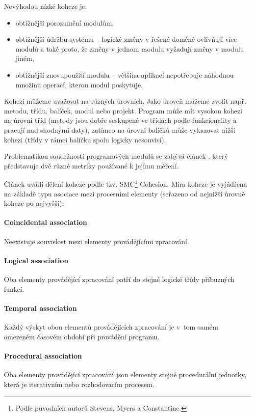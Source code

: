 Nevýhodou nízké koheze je:
\begin{itemize}
\item obtížnější porozumění modulům,
\item obtížnější údržbu systému -- logické změny v řešené doméně ovlivňují více modulů a také proto, že změny v jednom modulu vyžadují změny v modulu jiném,
\item obtížnější znovupoužití modulu -- většina aplikací nepotřebuje náhodnou množinu operací, kterou modul poskytuje.
\end{itemize}

Kohezi můžeme uvažovat na různých úrovních. Jako úroveň můžeme zvolit např. metodu, třídu, balíček, modul nebo projekt. Program může mít vysokou kohezi na úrovni tříd (metody jsou dobře seskupené ve třídách podle funkcionality a pracují nad shodnými daty), zatímco na úrovni balíčků může vykazovat nižší kohezi (třídy v rámci balíčku spolu logicky nesouvisí).

Problematikou soudržnosti programových modulů se zabývá článek \cite{Kang:1996:DCM:872750.873361}, který představuje dvě různé metriky používané k jejímu měření.

Článek \cite{ISI:000079726000029} uvádí dělení koheze podle tzv. SMC\footnote{Podle původních autorů Stevens, Myers a Constantine.} Cohesion. Míra koheze je vyjádřena na základě typu asociace mezi procesními elementy (seřazeno od nejnižší úrovně koheze po nejvyšší):

\paragraph{Coincidental association} Neexistuje souvislost mezi elementy provádějícími zpracování.

\paragraph{Logical association} Oba elementy provádějící zpracování patří do stejné logické třídy příbuzných funkcí.

\paragraph{Temporal association} Každý výskyt obou elementů provádějících zpracování je v~tom samém omezeném časovém období při provádění programu.

\paragraph{Procedural association} Oba elementy provádějící zpracování jsou elementy stejné procedurální jednotky, která je iterativním nebo rozhodovacím procesem.

